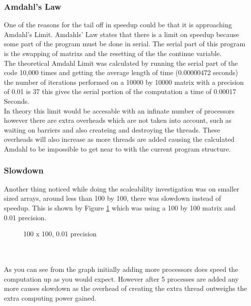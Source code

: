 \documentclass{article}
\begin{document}
 \subsubsection{Amdahl’s Law}
 One of the reasons for the tail off in speedup could be that it is approaching
 Amdahl's Limit. Amdahls' Law states that there is a limit on speedup because
 some part of the program must be done in serial. The serial part of this program
 is the swapping of matrixs and the resetting of the the continue variable.\\
 The theoretical Amdahl Limit was calculated by running the serial part of the code 10,000
 times and getting the average length of time (0.00000472 seconds) the number of
 iterations performed on a 10000 by 10000 matrix with a precision of 0.01 is 37
 this gives the serial portion of the computation a time of 0.00017 Seconds.\\
 In theory this limit would be accesable with an infinate number of processors
 however there are extra overheads which are not taken into account, such as waiting
 on barriers and also createing and destroying the threads. These overheads will also
 increase as more threads are added causing the calculated Amdahl to be impossible to
 get near to with the current program structure.

\subsubsection{Slowdown}

Another thing noticed while doing the scaleability investigation was on smaller
sized arrays, around less than 100 by 100, there was slowdown instead of speedup.
This is shown by Figure \ref{fig:slowdown} which was using a 100 by 100 matrix and 0.01
precision.

\begin{figure}[H]
 \centering
 \caption{100 x 100, 0.01 precision}
 \label{fig:slowdown}
\end{figure}\\~\\

As you can see from the graph initially adding more processors does speed the
computation up as you would expect. However after 5 processes are added any more causes
slowdown as the overhead of creating the extra thread outweighs the extra computing
power gained.
\end{document}
